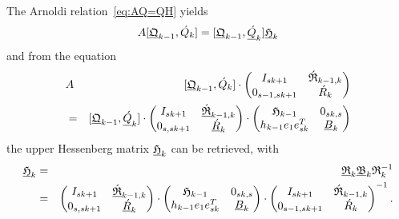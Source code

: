 \documentclass{scrartcl}
\numberwithin{equation}{section}
\begin{document}
The Arnoldi relation~\eqref{eq:AQ=QH} yields
\begin{eqnarray*}
	A [\underline{\frak{Q}}_{k - 1}, \acute{Q}_k] = [ \underline{\frak{Q}}_{k - 1}, \underline{\acute{Q}}_k ] \underline{\frak{H}}_k
\end{eqnarray*}
and from the equation
\begin{eqnarray}
&A& [\underline{\frak{Q}}_{k - 1}, \acute{Q}_k] \cdot 
\begin{pmatrix}
	I_{sk + 1} & \acute{\frak{R}}_{k - 1, k} \\
	0_{s - 1, sk + 1} &\acute{R}_k \\
\end{pmatrix} \nonumber \\
&=& [ \underline{\frak{Q}}_{k - 1}, \underline{\acute{Q}}_k ] \cdot 
\begin{pmatrix}
	I_{sk + 1} & \underline{\acute{\frak{R}}}_{k - 1, k} \\
	0_{s, sk + 1} & \underline{\acute{R}}_k \\
\end{pmatrix} \cdot
\begin{pmatrix}
	\frak{H}_{k - 1} & 0_{sk, s} \\
	h_{k - 1} e_1 e^T_{sk} & \underline{B}_k \\
\end{pmatrix}
\end{eqnarray}
the upper Hessenberg matrix $\underline{\frak{H}}_k$ can be retrieved, with
\begin{eqnarray} \label{eq:AQR=QRB}
	\underline{\frak{H}}_k &=& \underline{\frak{R}}_k \underline{\frak{B}}_k \frak{R}^{-1}_k \nonumber\\
	&=& 
	\begin{pmatrix}
		I_{sk + 1} & \underline{\acute{\frak{R}}}_{k - 1, k} \\
		0_{s, sk + 1} & \underline{\acute{R}}_k \\
	\end{pmatrix} \cdot
	\begin{pmatrix}
		\frak{H}_{k - 1} & 0_{sk, s} \\
		h_{k - 1} e_1 e^T_{sk} & \underline{B}_k \\
	\end{pmatrix} \cdot
	\begin{pmatrix}
		I_{sk + 1} & \acute{\frak{R}}_{k - 1, k} \\
		0_{s - 1, sk + 1} &\acute{R}_k \\
	\end{pmatrix}^{-1}.
\end{eqnarray}
\end{document}
